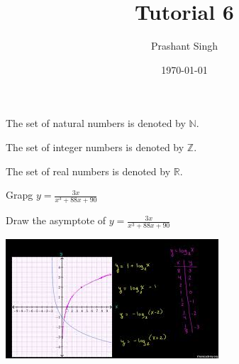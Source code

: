 \documentclass[11pt]{article}
\def\eq1{y = \frac{3x}{x^3 + 88x + 90}}
\begin{document}
	\title{Tutorial 6}
	\author{Prashant Singh}
	\date{\today}
	\maketitle
	
	The set of natural numbers is denoted by $\mathbb{N}$.
	
	The set of integer numbers is denoted by $\mathbb{Z}$.
	
	The set of real numbers is denoted by $\mathbb{R}$.
	
	Grapg $\eq1$
	
	Draw the asymptote of $\eq1$
	
	\includegraphics[scale=0.75]{index.jpeg}
\end{document}
